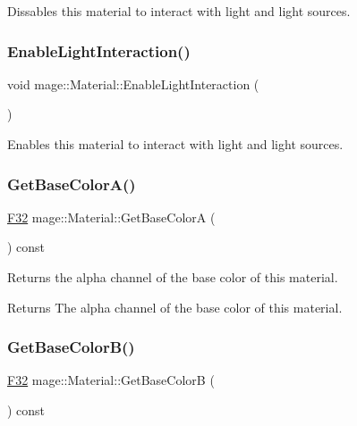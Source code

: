Dissables this material to interact with light and light sources. \hypertarget{structmage_1_1_material_abbcdcc3a9cb44c854212508c8419aa7f}{}\label{structmage_1_1_material_abbcdcc3a9cb44c854212508c8419aa7f} 
\subsubsection{\texorpdfstring{Enable\+Light\+Interaction()}{EnableLightInteraction()}}
{\footnotesize\ttfamily void mage\+::\+Material\+::\+Enable\+Light\+Interaction (\begin{DoxyParamCaption}{ }\end{DoxyParamCaption})\hspace{0.3cm}{\ttfamily [noexcept]}}

Enables this material to interact with light and light sources. \hypertarget{structmage_1_1_material_ad96a20683c2aa0f90d189066567d9cd4}{}\label{structmage_1_1_material_ad96a20683c2aa0f90d189066567d9cd4} 
\subsubsection{\texorpdfstring{Get\+Base\+Color\+A()}{GetBaseColorA()}}
{\footnotesize\ttfamily \hyperlink{namespacemage_aa97e833b45f06d60a0a9c4fc22ae02c0}{F32} mage\+::\+Material\+::\+Get\+Base\+ColorA (\begin{DoxyParamCaption}{ }\end{DoxyParamCaption}) const\hspace{0.3cm}{\ttfamily [noexcept]}}

Returns the alpha channel of the base color of this material.

\begin{DoxyReturn}{Returns}
The alpha channel of the base color of this material. 
\end{DoxyReturn}
\hypertarget{structmage_1_1_material_ac24c2c36e2ddcf1802ad44a6c45fb17d}{}\label{structmage_1_1_material_ac24c2c36e2ddcf1802ad44a6c45fb17d} 
\subsubsection{\texorpdfstring{Get\+Base\+Color\+B()}{GetBaseColorB()}}
{\footnotesize\ttfamily \hyperlink{namespacemage_aa97e833b45f06d60a0a9c4fc22ae02c0}{F32} mage\+::\+Material\+::\+Get\+Base\+ColorB (\begin{DoxyParamCaption}{ }\end{DoxyParamCaption}) const\hspace{0.3cm}{\ttfamily [noexcept]}}


